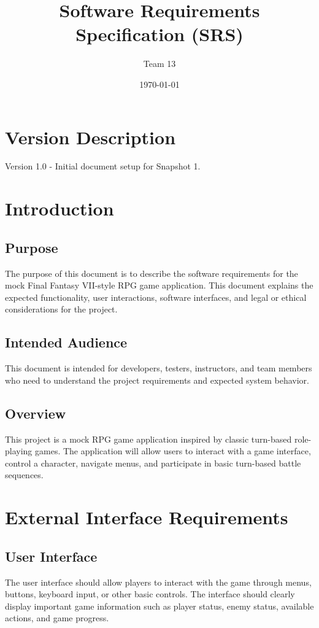 \documentclass{article}
\begin{document}
\title{Software Requirements Specification (SRS)}
\author{Team 13}
\date{\today}
\maketitle

\newpage
\tableofcontents
\newpage

\section{Version Description}
Version 1.0 - Initial document setup for Snapshot 1.

\section{Introduction}

\subsection{Purpose}
The purpose of this document is to describe the software requirements for the mock Final Fantasy VII-style RPG game application. This document explains the expected functionality, user interactions, software interfaces, and legal or ethical considerations for the project.

\subsection{Intended Audience}
This document is intended for developers, testers, instructors, and team members who need to understand the project requirements and expected system behavior.

\subsection{Overview}
This project is a mock RPG game application inspired by classic turn-based role-playing games. The application will allow users to interact with a game interface, control a character, navigate menus, and participate in basic turn-based battle sequences.

\section{External Interface Requirements}

\subsection{User Interface}
The user interface should allow players to interact with the game through menus, buttons, keyboard input, or other basic controls. The interface should clearly display important game information such as player status, enemy status, available actions, and game progress.
\end{document}
